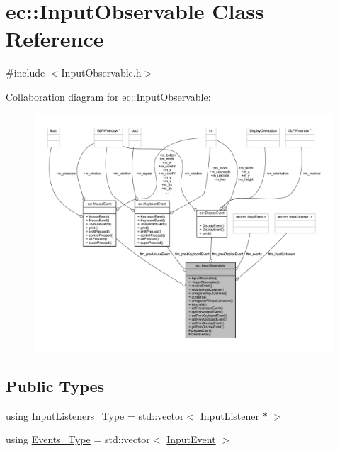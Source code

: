 \hypertarget{classec_1_1_input_observable}{}\section{ec\+:\+:Input\+Observable Class Reference}
\label{classec_1_1_input_observable}


{\ttfamily \#include $<$Input\+Observable.\+h$>$}



Collaboration diagram for ec\+:\+:Input\+Observable\+:\nopagebreak
\begin{figure}[H]
\begin{center}
\leavevmode
\includegraphics[width=350pt]{classec_1_1_input_observable__coll__graph}
\end{center}
\end{figure}
\subsection*{Public Types}
\begin{DoxyCompactItemize}
\item 
using \mbox{\hyperlink{classec_1_1_input_observable_a7a1e7fe634b426e59ddae7f11c21bebb}{Input\+Listeners\+\_\+\+Type}} = std\+::vector$<$ \mbox{\hyperlink{classec_1_1_input_listener}{Input\+Listener}} $\ast$ $>$
\item 
using \mbox{\hyperlink{classec_1_1_input_observable_ac2476cc82c72ba20dcd8d5c89794f577}{Events\+\_\+\+Type}} = std\+::vector$<$ \mbox{\hyperlink{structec_1_1_input_event}{Input\+Event}} $>$
\end{DoxyCompactItemize}
